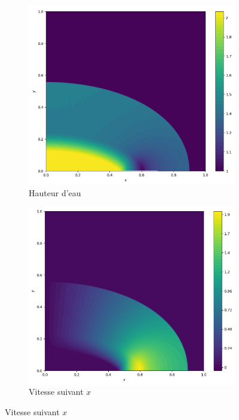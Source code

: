 \documentclass[
	french,
	11pt, %
]{fphw}
\begin{document}
\begin{figure}[H]
	\centering
	\begin{subfigure}{0.32\textwidth}
		\centering
		\includegraphics[width=\textwidth,height=0.85\textwidth]{Muscl2h.png}
		\caption{Hauteur d'eau}
		\label{fig:Muscl2h}
	\end{subfigure}
	\begin{subfigure}{0.32\textwidth}
		\centering
		\includegraphics[width=\textwidth,height=0.85\textwidth]{Muscl2u.png}
		\caption{Vitesse suivant $x$}

\end{subfigure}
\end{figure}
\end{document}
